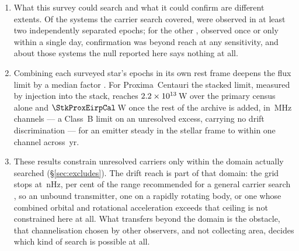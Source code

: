 \begin{enumerate}[leftmargin=1.6em,itemsep=4pt,topsep=4pt,parsep=0pt]
\item What this survey could search and what it could confirm are different
extents. Of the \NSysClassA{} systems the carrier search covered,
\ScSysIndep{} were observed in at least two independently separated epochs;
for the other \ScSysNoConf, observed once or only within a single day,
confirmation was beyond reach at any sensitivity, and about those systems the
null reported here says nothing at all.

\item Combining each surveyed star's epochs in its own rest frame deepens
the flux limit by a median factor \SyStkGainMed. For Proxima~Centauri the
stacked limit, measured by injection into the stack, reaches
$2.2\times10^{13}$\,W over the primary census alone and
$\StkProxEirpCal$\,W once the rest of the archive is added, in
\ChanBModeMHz\,MHz channels --- a Class~B limit on an unresolved excess,
carrying no drift discrimination --- for an emitter steady in the stellar
frame to within one channel across \StkProxSpanYr\,yr.

\item These results constrain unresolved carriers only within the domain
actually searched (\S\ref{sec:excludes}). The drift reach is part of that
domain: the grid stops at \DriftCeilLo\,nHz, \AccelSheikhPct{} per cent of
the range recommended for a general carrier search \citep{Sheikh2019}, so an
unbound transmitter, one on a rapidly rotating body, or one whose combined
orbital and rotational acceleration exceeds that ceiling is not constrained
here at all. What transfers beyond the domain is the
obstacle, that channelisation chosen by other observers, and not
collecting area, decides which kind of search is possible at all.

\end{enumerate}
